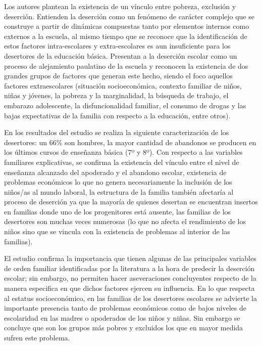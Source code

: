 Los autores plantean la existencia de un vínculo entre pobreza, exclusión y deserción. Entienden la deserción como un fenómeno de carácter complejo que se construye a partir de dinámicas compuestas tanto por elementos internos como externos a la escuela, al mismo tiempo que se reconoce que la identificación de estos factores intra-escolares y extra-escolares es aun insuficiente para los desertores de la educación básica.  Presentan a la deserción escolar como un proceso de alejamiento paulatino de la escuela y reconocen la existencia de dos grandes grupos de factores que generan este hecho, siendo el foco aquellos factores extraescolares (situación socioeconómica, contexto familiar de niños, niñas y jóvenes, la pobreza y la marginalidad, la búsqueda de trabajo, el embarazo adolescente, la disfuncionalidad familiar, el consumo de drogas y las bajas expectativas de la familia con respecto a la educación, entre otros).

En los resultados del estudio se realiza la siguiente caracterización de los desertores: un 66\% son hombres, la mayor cantidad de abandonos se producen en los últimos cursos de enseñanza básica (7º y 8º). Con respecto a las variables familiares explicativas, se confirma la existencia del vínculo entre el nivel de enseñanza alcanzado del apoderado y el abandono escolar, existencia de problemas económicos lo que no genera necesariamente la inclusión de los niños/as al mundo laboral, la estructura de la familia también afectaría al proceso de deserción ya que la mayoría de quienes desertan se encuentran insertos en familias donde uno de los progenitores está ausente, las familias de los desertores son muchas veces numerosas (lo que no afecta el rendimiento de los niños sino que se vincula con la existencia de problemas al interior de las familias).

El estudio confirma la importancia que tienen algunas de las principales variables de orden familiar identificadas por la literatura a la hora de predecir la deserción escolar; sin embargo, no permiten hacer aseveraciones concluyentes respecto de la manera especifica en que dichos factores ejercen su influencia. En lo que respecta al estatus socioeconómico, en las familias de los desertores escolares se advierte la importante presencia tanto de problemas económicos como de bajos niveles de escolaridad en las madres o apoderados de los niños y niñas. Sin embargo se concluye que son los grupos más pobres y excluidos los que en mayor medida sufren este problema.

